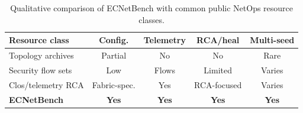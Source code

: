 \begin{table}[!t]
\centering
\caption{Qualitative comparison of ECNetBench with common public NetOps resource classes.}
\label{tab:contrib}
\renewcommand{\arraystretch}{1.1}
\setlength{\tabcolsep}{3pt}
{\footnotesize\begin{tabular*}{\columnwidth}{@{\extracolsep{\fill}}lcccc}
\toprule
Resource class & Config. & Telemetry & RCA/heal & Multi-seed \\
\midrule
Topology archives & Partial & No & No & Rare \\
Security flow sets & Low & Flows & Limited & Varies \\
Clos/telemetry RCA & Fabric-spec. & Yes & RCA-focused & Varies \\
\textbf{ECNetBench} & \textbf{Yes} & \textbf{Yes} & \textbf{Yes} & \textbf{Yes} \\
\bottomrule
\end{tabular*}}
\end{table}
